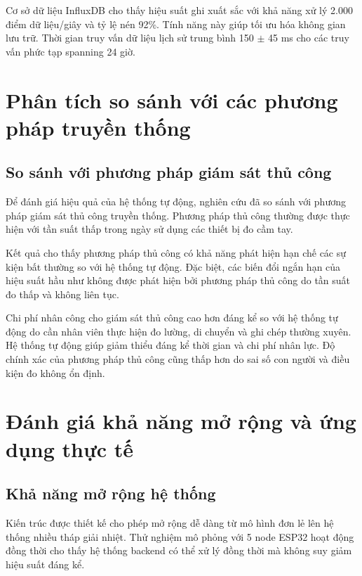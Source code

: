 \documentclass[../main.tex]{subfiles}
\begin{document}
Cơ sở dữ liệu InfluxDB cho thấy hiệu suất ghi xuất sắc với khả năng xử lý 2.000 điểm dữ liệu/giây và tỷ lệ nén 92\%. Tính năng này giúp tối ưu hóa không gian lưu trữ. Thời gian truy vấn dữ liệu lịch sử trung bình 150 $\pm$ 45 ms cho các truy vấn phức tạp spanning 24 giờ.

\section{Phân tích so sánh với các phương pháp truyền thống}
\label{sec:comparison_traditional_methods}

\subsection{So sánh với phương pháp giám sát thủ công}
\label{sec:manual_monitoring_comparison}

Để đánh giá hiệu quả của hệ thống tự động, nghiên cứu đã so sánh với phương pháp giám sát thủ công truyền thống. Phương pháp thủ công thường được thực hiện với tần suất thấp trong ngày sử dụng các thiết bị đo cầm tay.

Kết quả cho thấy phương pháp thủ công có khả năng phát hiện hạn chế các sự kiện bất thường so với hệ thống tự động. Đặc biệt, các biến đổi ngắn hạn của hiệu suất hầu như không được phát hiện bởi phương pháp thủ công do tần suất đo thấp và không liên tục.

Chi phí nhân công cho giám sát thủ công cao hơn đáng kể so với hệ thống tự động do cần nhân viên thực hiện đo lường, di chuyển và ghi chép thường xuyên. Hệ thống tự động giúp giảm thiểu đáng kể thời gian và chi phí nhân lực. Độ chính xác của phương pháp thủ công cũng thấp hơn do sai số con người và điều kiện đo không ổn định.

\section{Đánh giá khả năng mở rộng và ứng dụng thực tế}
\label{sec:scalability_evaluation}

\subsection{Khả năng mở rộng hệ thống}
\label{sec:system_scalability}

Kiến trúc được thiết kế cho phép mở rộng dễ dàng từ mô hình đơn lẻ lên hệ thống nhiều tháp giải nhiệt. Thử nghiệm mô phỏng với 5 node ESP32 hoạt động đồng thời cho thấy hệ thống backend có thể xử lý đồng thời mà không suy giảm hiệu suất đáng kể.
\end{document}
